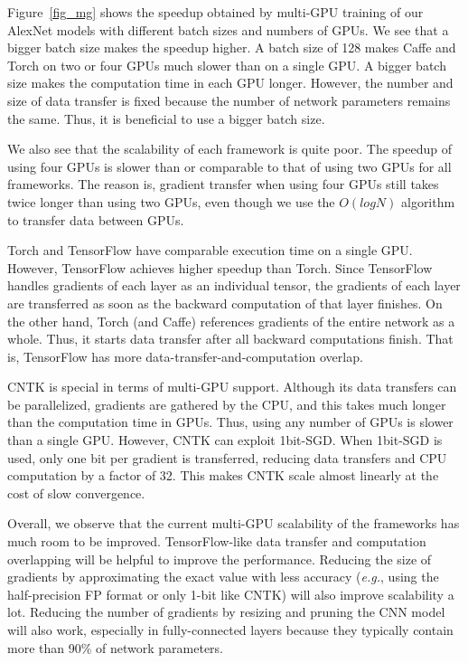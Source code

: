 Figure~\ref{fig_mg} shows the speedup obtained by multi-GPU training of our AlexNet models with different batch sizes and numbers of GPUs. We see that a bigger batch size makes the speedup higher. A batch size of 128 makes Caffe and Torch on two or four GPUs much slower than on a single GPU. A bigger batch size makes the computation time in each GPU longer. However, the number and size of data transfer is fixed because the number of network parameters remains the same. Thus, it is beneficial to use a bigger batch size.

We also see that the scalability of each framework is quite poor. The speedup of using four GPUs is slower than or comparable to that of using two GPUs for all frameworks. The reason is, gradient transfer when using four GPUs still takes twice longer than using two GPUs, even though we use the $O(log N)$ algorithm to transfer data between GPUs.

Torch and TensorFlow have comparable execution time on a single GPU. However, TensorFlow achieves higher speedup than Torch. Since TensorFlow handles gradients of each layer as an individual tensor, the gradients of each layer are transferred as soon as the backward computation of that layer finishes. On the other hand, Torch (and Caffe) references gradients of the entire network as a whole. Thus, it starts data transfer after all backward computations finish. That is, TensorFlow has more data-transfer-and-computation overlap.

CNTK is special in terms of multi-GPU support. Although its data transfers can be parallelized, gradients are gathered by the CPU, and this takes much longer than the computation time in GPUs. Thus, using any number of GPUs is slower than a single GPU. However, CNTK can exploit 1bit-SGD\cite{1-bit-stochastic-gradient-descent-and-application-to-data-parallel-distributed-training-of-speech-dnns}. When 1bit-SGD is used, only one bit per gradient is transferred, reducing data transfers and CPU computation by a factor of 32. This makes CNTK scale almost linearly at the cost of slow convergence.

Overall, we observe that the current multi-GPU scalability of the frameworks has much room to be improved. TensorFlow-like data transfer and computation overlapping will be helpful to improve the performance. Reducing the size of gradients by approximating the exact value with less accuracy (\textit{e.g.}, using the half-precision FP format or only 1-bit like CNTK) will also improve scalability a lot. Reducing the number of gradients by resizing and pruning the CNN model will also work, especially in fully-connected layers because they typically contain more than 90\% of network parameters.
